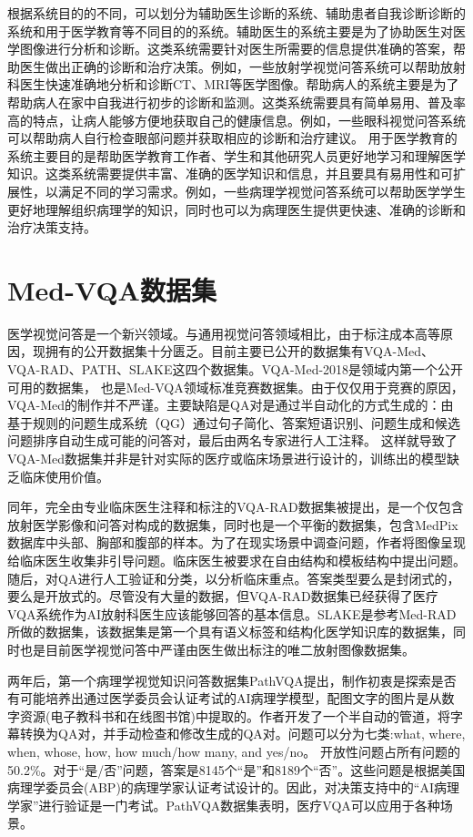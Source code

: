 \begin{enumerate}[topsep = 0 pt, itemsep= 0 pt, parsep=0pt, partopsep=0pt, leftmargin=0pt, itemindent=44pt, labelsep=6pt, listparindent=22pt, label=(\arabic*)]
	根据系统目的的不同，可以划分为辅助医生诊断的系统、辅助患者自我诊断诊断的系统和用于医学教育等不同目的的系统。辅助医生的系统主要是为了协助医生对医学图像进行分析和诊断。这类系统需要针对医生所需要的信息提供准确的答案，帮助医生做出正确的诊断和治疗决策。例如，一些放射学视觉问答系统可以帮助放射科医生快速准确地分析和诊断CT、MRI等医学图像。帮助病人的系统主要是为了帮助病人在家中自我进行初步的诊断和监测。这类系统需要具有简单易用、普及率高的特点，让病人能够方便地获取自己的健康信息。例如，一些眼科视觉问答系统可以帮助病人自行检查眼部问题并获取相应的诊断和治疗建议。
    用于医学教育的系统主要目的是帮助医学教育工作者、学生和其他研究人员更好地学习和理解医学知识。这类系统需要提供丰富、准确的医学知识和信息，并且要具有易用性和可扩展性，以满足不同的学习需求。例如，一些病理学视觉问答系统可以帮助医学学生更好地理解组织病理学的知识，同时也可以为病理医生提供更快速、准确的诊断和治疗决策支持。
\end{enumerate}

\section{Med-VQA数据集}
医学视觉问答是一个新兴领域。与通用视觉问答领域相比，由于标注成本高等原因，现拥有的公开数据集十分匮乏。目前主要已公开的数据集有VQA-Med、VQA-RAD、PATH、SLAKE这四个数据集。VQA-Med-2018\cite{hasan2018overview}是领域内第一个公开可用的数据集，
也是Med-VQA领域标准竞赛数据集。由于仅仅用于竞赛的原因，VQA-Med的制作并不严谨。主要缺陷是QA对是通过半自动化的方式生成的：由基于规则的问题生成系统（QG）通过句子简化、答案短语识别、问题生成和候选问题排序自动生成可能的问答对，最后由两名专家进行人工注释。
这样就导致了VQA-Med数据集并非是针对实际的医疗或临床场景进行设计的，训练出的模型缺乏临床使用价值。

同年，完全由专业临床医生注释和标注的VQA-RAD\cite{lau2018dataset}数据集被提出，是一个仅包含放射医学影像和问答对构成的数据集，同时也是一个平衡的数据集，包含MedPix数据库中头部、胸部和腹部的样本。为了在现实场景中调查问题，作者将图像呈现给临床医生收集非引导问题。临床医生被要求在自由结构和模板结构中提出问题。
随后，对QA进行人工验证和分类，以分析临床重点。答案类型要么是封闭式的，要么是开放式的。尽管没有大量的数据，但VQA-RAD数据集已经获得了医疗VQA系统作为AI放射科医生应该能够回答的基本信息。SLAKE\cite{liu2021slake}是参考Med-RAD所做的数据集，该数据集是第一个具有语义标签和结构化医学知识库的数据集，同时也是目前医学视觉问答中严谨由医生做出标注的唯二放射图像数据集。

两年后，第一个病理学视觉知识问答数据集PathVQA\cite{he2020pathvqa}提出，制作初衷是探索是否有可能培养出通过医学委员会认证考试的AI病理学模型，配图文字的图片是从数字资源(电子教科书和在线图书馆)中提取的。作者开发了一个半自动的管道，将字幕转换为QA对，并手动检查和修改生成的QA对。问题可以分为七类:what, where, when, whose, how, how much/how many, and yes/no。
开放性问题占所有问题的50.2\%。对于“是/否”问题，答案是8145个“是”和8189个“否”。这些问题是根据美国病理学委员会(ABP)的病理学家认证考试设计的。因此，对决策支持中的“AI病理学家”进行验证是一门考试。PathVQA数据集表明，医疗VQA可以应用于各种场景。

